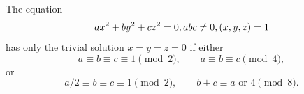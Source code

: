 \begin{proposition}
    The equation
\[
    ax^2+by^2+cz^2=0,\\ abc\ne0,\\ (x,y,z)=1
\]
    has only the trivial solution $x=y=z=0$ if either
\[
    a\equiv b\equiv c\equiv1\pmod2,\qquad a\equiv b\equiv c\pmod4,
\]
    or
\[
    a/2\equiv b\equiv c\equiv1\pmod2,\qquad b+c\equiv a\text{ or }4\pmod8.
\]
\end{proposition}
